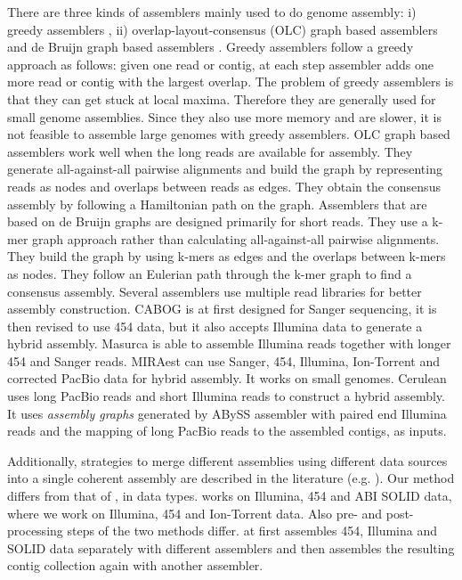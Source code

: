 \documentclass{llncs}
\begin{document}
There are three kinds of assemblers mainly used to do genome assembly: i) greedy assemblers \cite{ssake:2007,sharcgs:2007,vcake:2007}, ii) overlap-layout-consensus (OLC) graph based assemblers \cite{celera:2000, sga:2012, hapsemblerDonmez:2011} and de Bruijn graph based assemblers \cite{eulerPevzner:2008, abyssSimpson:2009, velvetZerbino:2008, spadesBankevich:2012, allpaths:2008}. Greedy assemblers follow a greedy approach  as follows: given one read or contig,  at each step assembler adds one more read or contig with the largest overlap. The problem of greedy assemblers is that they can get stuck at local maxima. Therefore they are generally used for small genome assemblies. Since they also use more memory and are slower, it is not feasible to assemble large genomes with greedy assemblers.
OLC graph based assemblers work well when the long reads are available for assembly. They generate all-against-all pairwise alignments and build the graph by representing reads as nodes and overlaps between reads as edges. 
They obtain the consensus assembly by following a Hamiltonian path on the graph. 
Assemblers that are based on de Bruijn graphs are designed primarily for short reads. 
They use a k-mer graph approach rather than calculating all-against-all pairwise alignments. They build the graph by using k-mers as edges and the overlaps between k-mers as nodes. They follow an Eulerian path through the k-mer graph to find a consensus assembly.
Several assemblers use multiple read libraries \cite{cabogMiller:2008, masurcaZimin:2013, miraest, cerulian:2013} for better assembly construction. CABOG \cite{cabogMiller:2008} is at first designed for Sanger sequencing, it is then revised to use 454 data, but it also accepts Illumina data to 
generate a hybrid assembly. Masurca \cite{masurcaZimin:2013} is able to assemble Illumina reads   together with longer 454 and Sanger reads. MIRAest \cite{miraest} can use Sanger, 454, Illumina, Ion-Torrent and corrected PacBio data for hybrid assembly. It works on small genomes. Cerulean \cite{cerulian:2013} uses long PacBio reads and short Illumina reads to construct a hybrid assembly. It uses \textit{assembly graphs} generated by ABySS \cite{abyssSimpson:2009} assembler with paired end Illumina reads and the mapping of long PacBio reads to the assembled contigs, as inputs.

Additionally, strategies to merge different assemblies using different data sources into a single coherent assembly are described in the literature (e.g. \cite{wang:2012}). Our method differs from that of \cite{wang:2012}, in data types. \cite{wang:2012} works on Illumina, 454 and ABI SOLID data, where we work on Illumina, 454 and Ion-Torrent data. Also pre- and post-processing steps of the two methods differ. \cite{wang:2012} at first assembles 454, Illumina and SOLID data separately with different assemblers and then assembles the resulting contig collection again with another assembler.
\end{document}
